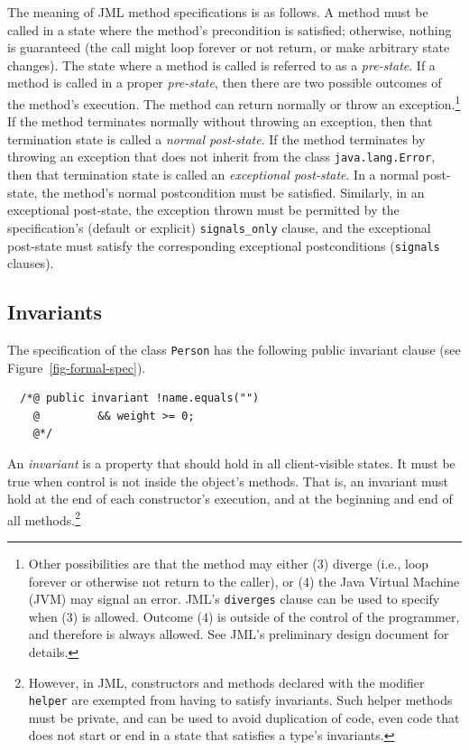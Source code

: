\documentclass[twocolumn]{article}
\begin{document}
The meaning of JML method specifications is as follows.  A method must
be called in a state where the method's precondition is satisfied;
otherwise, nothing is guaranteed (the call might loop forever or not
return, or make arbitrary state changes).
The state where a method is called is referred to as a
\emph{pre-state}.  If a method is called in a proper \emph{pre-state},
then there are two possible outcomes of the method's execution.  The
method can return normally or throw an exception.\footnote{
  Other
  possibilities are that the method may either (3) diverge (i.e., loop
  forever or otherwise not return to the caller), or (4) the
  Java Virtual Machine (JVM) may signal an error. JML's
  \texttt{diverges} clause can be used to specify when (3) is allowed.
  Outcome (4) is outside of the control of the programmer, and
  therefore is always allowed. See JML's preliminary design document
  \cite{Leavens-Baker-Ruby06} for details.}
If the method terminates normally without throwing an exception, 
then that termination state is called a \emph{normal post-state}.
If the method terminates by throwing an
exception that does not inherit from the class \texttt{java.lang.Error},
then that termination state is called an
\emph{exceptional post-state}.
In a normal post-state, the method's normal postcondition must be satisfied.
Similarly, in an exceptional post-state,
the exception thrown must be
permitted by the specification's (default or explicit)
\verb|signals_only| clause, and the exceptional post-state must
satisfy the corresponding exceptional postconditions
(\texttt{signals} clauses).

\subsection{Invariants}
\label{sect-invariants}

The specification of the class \texttt{Person} has the following
public invariant clause (see Figure~\ref{fig-formal-spec}).

\begin{verbatim}
  /*@ public invariant !name.equals("")
    @         && weight >= 0;
    @*/
\end{verbatim}

An \emph{invariant\/} is a property that should hold in all
client-visible states.
It must be true when control is not inside the object's
methods.  
That is, an invariant must hold at the end of each constructor's
execution, and at the beginning and end of all methods.\footnote{
  However, in JML, constructors and methods declared with the modifier
  \texttt{helper} are exempted from having to satisfy invariants.
  Such helper methods must be private, and can be used to avoid duplication
  of code, even code that does not start or end in a state that
  satisfies a type's invariants.}
\end{document}
